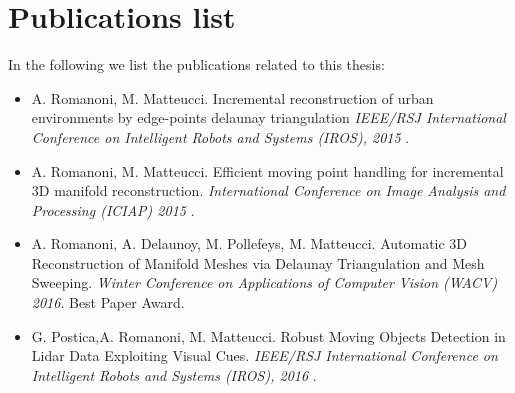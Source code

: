 \section{Publications list}
In the following we list the publications related to this thesis:
\begin{itemize}
 \item  A. Romanoni, M. Matteucci. Incremental reconstruction of urban environments by edge-points delaunay triangulation  \emph{IEEE/RSJ International Conference on Intelligent Robots and Systems (IROS), 2015} \cite{romanoni15b}.
 \item A. Romanoni, M. Matteucci. Efficient moving point handling for incremental 3D manifold reconstruction. \emph{International Conference on Image Analysis and Processing (ICIAP) 2015} \cite{romanoni15a}.
 \item A. Romanoni, A. Delaunoy, M. Pollefeys, M. Matteucci. Automatic 3D Reconstruction of Manifold Meshes via Delaunay Triangulation and Mesh Sweeping. \emph{Winter Conference on Applications of Computer Vision (WACV) 2016}. Best Paper Award. \cite{romanoni16}
 \item G. Postica,A. Romanoni, M. Matteucci. Robust Moving Objects Detection in Lidar Data Exploiting Visual Cues. \emph{IEEE/RSJ International Conference on Intelligent Robots and Systems (IROS), 2016}  \cite{postica16}.
\end{itemize}










